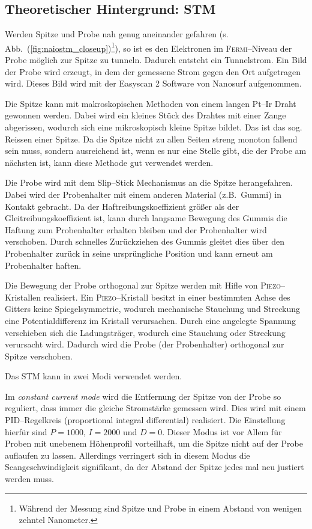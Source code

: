 \documentclass[sn-mathphys-num,iicol]{sn-jnl}
\theoremstyle{thmstyleone}
\theoremstyle{thmstyletwo}
\theoremstyle{thmstylethree}
\begin{document}
\subsection{Theoretischer Hintergrund: STM}
Werden Spitze und Probe nah genug aneinander gefahren (s. Abb.\ (\ref{fig:naiostm_closeup})\footnote{Während der Messung sind Spitze und Probe in einem Abstand von wenigen zehntel Nanometer.}), so ist es den Elektronen im \textsc{Fermi}--Niveau der Probe möglich zur Spitze zu tunneln.
Dadurch entsteht ein Tunnelstrom.
Ein Bild der Probe wird erzeugt, in dem der gemessene Strom gegen den Ort aufgetragen wird.
Dieses Bild wird mit der \glqq Easyscan 2\grqq{} Software von Nanosurf aufgenommen.

Die Spitze kann mit makroskopischen Methoden von einem langen Pt--Ir Draht gewonnen werden.
Dabei wird ein kleines Stück des Drahtes mit einer Zange abgerissen, wodurch sich eine mikroskopisch kleine Spitze bildet. Das ist das sog. Reissen einer Spitze.
Da die Spitze nicht zu allen Seiten streng monoton fallend sein muss, sondern ausreichend ist, wenn es nur eine Stelle gibt, die der Probe am nächsten ist, kann diese Methode gut verwendet werden. %

Die Probe wird mit dem Slip--Stick Mechanismus an die Spitze herangefahren.
Dabei wird der Probenhalter mit einem anderen Material (z.B.\ Gummi) in Kontakt gebracht.
Da der Haftreibungskoeffizient größer als der Gleitreibungskoeffizient ist, kann durch langsame Bewegung des Gummis die Haftung zum Probenhalter erhalten bleiben und der Probenhalter wird verschoben.
Durch schnelles Zurückziehen des Gummis gleitet dies über den Probenhalter zurück in seine ursprüngliche Position und kann erneut am Probenhalter haften.

Die Bewegung der Probe orthogonal zur Spitze werden mit Hifle von \textsc{Piezo}--Kristallen realisiert.
Ein \textsc{Piezo}--Kristall besitzt in einer bestimmten Achse des Gitters keine Spiegelsymmetrie, wodurch mechanische Stauchung und Streckung eine Potentialdifferenz im Kristall verursachen.
Durch eine angelegte Spannung verschieben sich die Ladungsträger, wodurch eine Stauchung oder Streckung verursacht wird.
Dadurch wird die Probe (der Probenhalter) orthogonal zur Spitze verschoben.

Das STM kann in zwei Modi verwendet werden.

Im \textit{constant current mode} wird die Entfernung der Spitze von der Probe so reguliert, dass immer die gleiche Stromstärke gemessen wird.
Dies wird mit einem PID--Regelkreis (proportional integral differential) realisiert.
Die Einstellung hierfür sind $P=1000$, $I=2000$ und $D=0$.
Dieser Modus ist vor Allem für Proben mit unebenem Höhenprofil vorteilhaft, um die Spitze nicht auf der Probe auflaufen zu lassen.
Allerdings verringert sich in diesem Modus die Scangeschwindigkeit signifikant, da der Abstand der Spitze jedes mal neu justiert werden muss.
\end{document}
